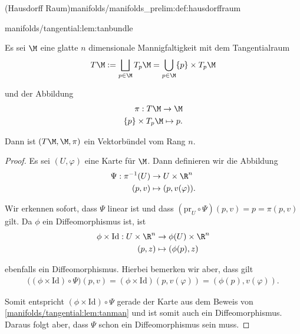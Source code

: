 \documentclass[letterpaper,10pt,english]{jupyterBook}
\begin{document}
\begin{definition}{(Hausdorff Raum)}{manifolds/manifolds_prelim:def:hausdorffraum}
\begin{lemma}{}{manifolds/tangential:lem:tanbundle}
\par
Es sei \(\M\) eine glatte \(n\) dimensionale Mannigfaltigkeit mit dem Tangentialraum
\begin{align*}
T\M:= \bigsqcup_{p\in\M}  T_p\M = \bigcup_{p\in\M} \{p\} \times T_p\M
\end{align*}
\par
und der Abbildung
\begin{align*}
\pi:T\M\to \M\\
\{p\}\times T_p\M\mapsto p.
\end{align*}
\par
Dann ist \((T\M, \M, \pi)\) ein Vektorbündel vom Rang \(n\).
\end{lemma}

\begin{proof}
 Es sei \((U,\varphi)\) eine Karte für \(\M\).
Dann definieren wir die Abbildung
\begin{align*}
\Psi: \pi^{-1}(U) &\to U\times \R^n\\
(p,v) &\mapsto (p, v(\varphi)).
\end{align*}
\par
Wir erkennen sofort, dass \(\Psi\) linear ist und dass \((\text{pr}_U\circ\Psi)(p,v) = p = \pi(p,v)\) gilt.
Da \(\phi\) ein Diffeomorphismus ist, ist
\begin{align*}
\phi\times\text{Id}:U\times \R^n &\to \phi(U)\times\R^n\\
(p,z) &\mapsto (\phi(p), z)
\end{align*}
\par
ebenfalls ein Diffeomorphismus.
Hierbei bemerken wir aber, dass gilt
\begin{align*}
\big((\phi\times\text{Id})\circ \Psi\big)(p,v) = (\phi\times\text{Id})(p, v(\varphi)) = (\phi(p), v(\varphi)).
\end{align*}
\par
Somit entspricht \((\phi\times\text{Id})\circ \Psi\) gerade der Karte aus dem Beweis von \cref{manifolds/tangential:lem:tanman} und ist somit auch ein Diffeomorphismus.
Daraus folgt aber, dass \(\Psi\) schon ein Diffeomorphismus sein muss.
\end{proof}



\end{definition}
\end{document}
